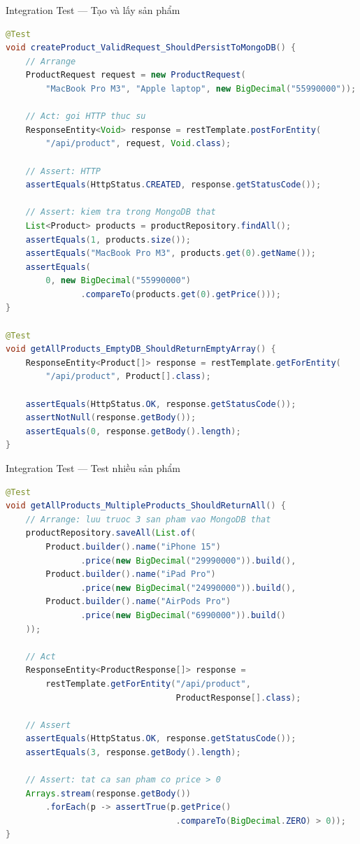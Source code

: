 \documentclass[aspectratio=169,10pt]{beamer}
\begin{document}
\begin{frame}[fragile]{Integration Test --- Tạo và lấy sản phẩm}
\begin{lstlisting}[language=Java]
@Test
void createProduct_ValidRequest_ShouldPersistToMongoDB() {
    // Arrange
    ProductRequest request = new ProductRequest(
        "MacBook Pro M3", "Apple laptop", new BigDecimal("55990000"));

    // Act: goi HTTP thuc su
    ResponseEntity<Void> response = restTemplate.postForEntity(
        "/api/product", request, Void.class);

    // Assert: HTTP
    assertEquals(HttpStatus.CREATED, response.getStatusCode());

    // Assert: kiem tra trong MongoDB that
    List<Product> products = productRepository.findAll();
    assertEquals(1, products.size());
    assertEquals("MacBook Pro M3", products.get(0).getName());
    assertEquals(
        0, new BigDecimal("55990000")
               .compareTo(products.get(0).getPrice()));
}

@Test
void getAllProducts_EmptyDB_ShouldReturnEmptyArray() {
    ResponseEntity<Product[]> response = restTemplate.getForEntity(
        "/api/product", Product[].class);

    assertEquals(HttpStatus.OK, response.getStatusCode());
    assertNotNull(response.getBody());
    assertEquals(0, response.getBody().length);
}
\end{lstlisting}
\end{frame}

\begin{frame}[fragile]{Integration Test --- Test nhiều sản phẩm}
\begin{lstlisting}[language=Java]
@Test
void getAllProducts_MultipleProducts_ShouldReturnAll() {
    // Arrange: luu truoc 3 san pham vao MongoDB that
    productRepository.saveAll(List.of(
        Product.builder().name("iPhone 15")
               .price(new BigDecimal("29990000")).build(),
        Product.builder().name("iPad Pro")
               .price(new BigDecimal("24990000")).build(),
        Product.builder().name("AirPods Pro")
               .price(new BigDecimal("6990000")).build()
    ));

    // Act
    ResponseEntity<ProductResponse[]> response =
        restTemplate.getForEntity("/api/product",
                                  ProductResponse[].class);

    // Assert
    assertEquals(HttpStatus.OK, response.getStatusCode());
    assertEquals(3, response.getBody().length);

    // Assert: tat ca san pham co price > 0
    Arrays.stream(response.getBody())
        .forEach(p -> assertTrue(p.getPrice()
                                  .compareTo(BigDecimal.ZERO) > 0));
}
\end{lstlisting}
\end{frame}
\end{document}
